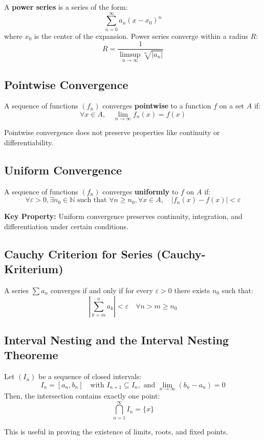 A \textbf{power series} is a series of the form:
\[
\sum_{n=0}^{\infty} a_n (x - x_0)^n
\]
where \(x_0\) is the center of the expansion. Power series converge within a radius \(R\):
\[
R = \frac{1}{\limsup\limits_{n \to \infty} \sqrt[n]{|a_n|}}
\]

\subsection{Pointwise Convergence}

A sequence of functions \((f_n)\) converges \textbf{pointwise} to a function \(f\) on a set \(A\) if:
\[
\forall x \in A, \quad \lim_{n \to \infty} f_n(x) = f(x)
\]

Pointwise convergence does not preserve properties like continuity or differentiability.

\subsection{Uniform Convergence}

A sequence of functions \((f_n)\) converges \textbf{uniformly} to \(f\) on \(A\) if:
\[
\forall \varepsilon > 0, \exists n_0 \in \mathbb{N} \text{ such that } \forall n \ge n_0, \forall x \in A, \quad |f_n(x) - f(x)| < \varepsilon
\]

\textbf{Key Property:} Uniform convergence preserves continuity, integration, and differentiation under certain conditions.

\subsection{Cauchy Criterion for Series (Cauchy-Kriterium)}

A series \(\sum a_n\) converges if and only if for every \(\varepsilon > 0\) there exists \(n_0\) such that:
\[
\left| \sum_{k = m}^{n} a_k \right| < \varepsilon \quad \forall n > m \ge n_0
\]

\subsection{Interval Nesting and the Interval Nesting Theoreme}

Let \((I_n)\) be a sequence of closed intervals:
\[
I_n = [a_n, b_n] \quad \text{with } I_{n+1} \subseteq I_n, \text{ and } \lim_{n \to \infty} (b_n - a_n) = 0
\]
Then, the intersection contains exactly one point:
\[
\bigcap_{n=1}^{\infty} I_n = \{x\}
\]

This is useful in proving the existence of limits, roots, and fixed points.


